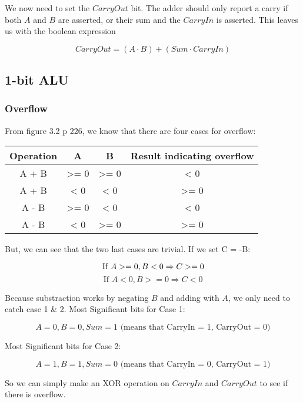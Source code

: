 \documentclass[11pt,a4paper]{article}
\begin{document}
We now need to set the $CarryOut$ bit. The adder should only report a
carry if both $A$ and $B$ are asserted, or their sum and the $CarryIn$ is asserted.
This leaves us with the boolean expression

\begin{equation*}
    CarryOut = (A \cdot B) + (Sum \cdot CarryIn)
\end{equation*}


\subsection*{1-bit ALU} %
\label{sub:1-bit_ALU}

\subsubsection*{Overflow}

From figure 3.2 p 226, we know that there are four cases for overflow:
\begin{table}[htb!]
\begin{tabular}{| c | c | c | c |}
    \centering
    Operation & A & B & Result indicating overflow \\ \hline
    A + B & >= 0 & >= 0 & < 0 \\
    A + B & < 0 & < 0 & >= 0 \\
    A - B & >= 0 & < 0 & < 0 \\
    A - B & < 0 & >= 0 & >= 0 \\
\end{tabular}
\end{table}

But, we can see that the two last cases are trivial. If we set C = -B:

\[
    \text{If } A >= 0, B < 0 \Rightarrow C >= 0 \\
\]
\[
    \text{If } A < 0, B >= 0 \Rightarrow C <0
\]

Because substraction works by negating $B$ and adding with $A$, we only need to catch case 1 \& 2.
Most Significant bits for Case 1:

\[
    A = 0, B = 0, Sum = 1 \text{ (means that CarryIn = 1, CarryOut = 0)}
\]

Most Significant bits for Case 2:

\[
    A = 1, B = 1, Sum = 0 \text{ (means that CarryIn = 0, CarryOut = 1)}
\]

So we can simply make an XOR operation on $CarryIn$ and $CarryOut$ to see if there is overflow.
\end{document}
